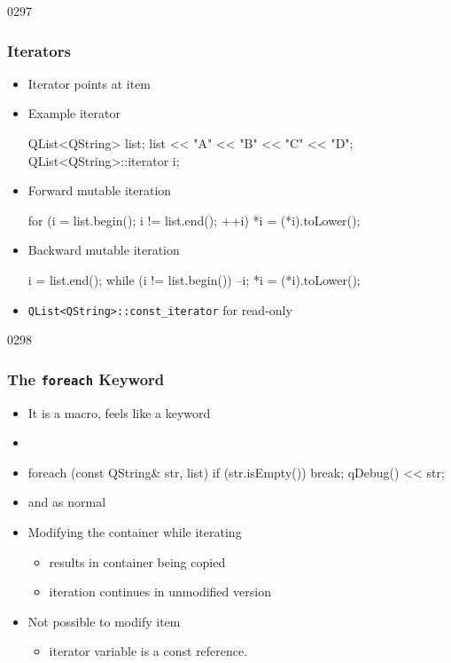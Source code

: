\begin{slide}[fragile]{0297}\frametitle{ Iterators}
\vspace*{-4mm}
\begin{itemize}
  \item Iterator points at item
  \item Example  iterator
\begin{cpp}
QList<QString> list;
list << "A" << "B" << "C" << "D";
QList<QString>::iterator i;
\end{cpp}
\item Forward mutable iteration
\begin{cpp}
for (i = list.begin(); i != list.end(); ++i) {
    *i = (*i).toLower();
}
\end{cpp}
\item Backward mutable iteration
\begin{cpp}
i = list.end();
while (i != list.begin()) {
    --i;
    *i = (*i).toLower();
}
\end{cpp}  
\item \lstinline{QList<QString>::const_iterator} for read-only
\end{itemize}
\end{slide}


\begin{slide}[fragile]{0298}\frametitle{The \texttt{foreach} Keyword}
\begin{itemize}
  \item It is a macro, feels like a keyword
  \item[]   
  \item[] \begin{cpp}
foreach (const QString& str, list) {
  if (str.isEmpty())
    break;
  qDebug() << str;
}    
  \end{cpp}
  \item {} and  as normal
  \item Modifying the container while iterating
  \begin{itemize}
  	\item results in container being copied
  	\item iteration continues in unmodified version
  \end{itemize}
  \item Not possible to modify item
  \begin{itemize}
  	\item iterator variable is a const reference.
  \end{itemize}
\end{itemize}
\end{slide}

